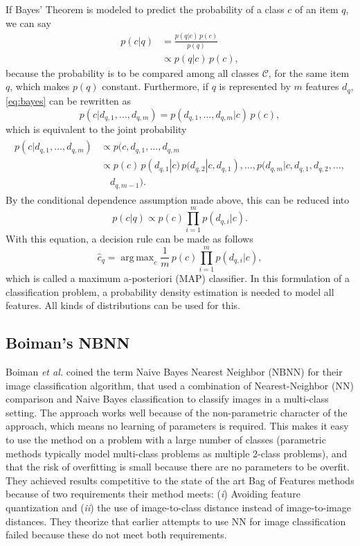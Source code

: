 \documentclass[a4paper,10pt]{article}
\DeclareMathOperator*{\argmax}{arg\,max}
\begin{document}
If Bayes' Theorem is modeled to predict the probability of a class $c$ of an item $q$, we can say
\begin{align}
    \label{eq:bayes}
    p(c|q)      &= \frac{p(q|c)\,p(c)}{p(q)}\\
                &\propto p(q|c)\,p(c),
\end{align}
because the probability is to be compared among all classes $\mathcal{C}$, for the same item $q$, which makes $p(q)$ constant. Furthermore, if $q$ is represented by $m$ features $d_q$, \eqref{eq:bayes} can be rewritten as
\begin{equation}
    p(c|d_{q,1},\dotsc,d_{q,m}) = p(d_{q,1}, \dotsc,d_{q,m}|c)\,p(c),
\end{equation}
which is equivalent to the joint probability
\begin{align}\begin{split}
    p(c|d_{q,1},\dotsc,d_{q,m}) &\propto p(c,d_{q,1}, \dotsc,d_{q,m}\\
        &\propto p(c)\,p(d_{q,1}|c)\, p(d_{q,2}|c,d_{q,1}), \dotsc,p(d_{q,m}|c,d_{q,1},d_{q,2},\dotsc,\\&\quad d_{q,m-1}).
    \end{split} 
\end{align}
By the conditional dependence assumption made above, this can be reduced into
\begin{equation}
    p(c|q) \propto p(c)\prod_{i=1}^m p(d_{q,i}|c).
\end{equation}
With this equation, a decision rule can be made as follows
\begin{equation} \label{eq:map}
    \hat c_q = \argmax_c \frac{1}{m}\,p(c)\prod_{i=1}^m p(d_{q,i}|c),
\end{equation}
which is called a maximum a-posteriori (MAP) classifier. In this formulation of a classification problem, a probability density estimation is needed to model all features. All kinds of distributions can be used for this.

\subsection{Boiman's NBNN} %
\label{sub:boiman_s_nbnn}
Boiman \emph{et al.} \cite{boiman2008defense} coined the term Naive Bayes Nearest Neighbor (NBNN) for their image classification algorithm, that used a combination of Nearest-Neighbor (NN) comparison and Naive Bayes classification to classify images in a multi-class setting. The approach works well because of the non-parametric character of the approach, which means no learning of parameters is required. This makes it easy to use the method on a problem with a large number of classes (parametric methods typically model multi-class problems as multiple 2-class problems), and that the risk of overfitting is small because there are no parameters to be overfit. They achieved results competitive to the state of the art Bag of Features methods because of two requirements their method meets: (\emph{i}) Avoiding feature quantization and (\emph{ii}) the use of image-to-class distance instead of image-to-image distances. They theorize that earlier attempts to use NN  for image classification failed because these do not meet both requirements.
\end{document}
